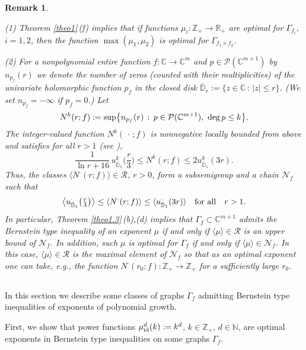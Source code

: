 \documentclass[11pt, oneside]{amsart}
\newtheorem{R}[Th]{Remark}
\begin{document}
\begin{R}\label{rem1.3}
{\rm (1) Theorem \ref{theo1}\,(f) implies that if functions $\mu_i:\mathbb Z_+\rightarrow\mathbb R_+$ are optimal for $\Gamma_{f_i}$, $i=1,2$, then the function
$\max(\mu_1,\mu_2)$ is optimal for $\Gamma_{f_1\times f_2}$.\smallskip

\noindent (2) For a nonpolynomial entire function $f:\mathbb C\rightarrow\mathbb C^m$ and $p\in\mathcal P(\mathbb C^{m+1})$ by $n_{p_f}(r)$ we denote the number of zeros (counted with their multiplicities) of the univariate holomorphic function $p_f$ in the closed disk $\bar{\mathbb D}_r:=\{z\in\mathbb C\, :\, |z|\le r\}$. (We set $n_{p_f}=-\infty$ if $p_f=0$.) Let 
\[
N^k(r;f):=\sup\bigl\{n_{p_f}(r)\, :\, p\in\mathcal P(\mathbb C^{m+1}),\  {\rm deg}\, p\le k\bigr\}.
\]
The integer-valued function $N^k(\,\cdot\, ;f)$ is nonnegative locally bounded from above and satisfies for all $r>1$ (see \cite[Cor.\,2.3]{CP1}),
\[
\frac{1}{\ln r+16}\,u_{\bar{\mathbb D}_1}^k\bigl(\mbox{$\frac r3$}\bigr)\le N^k(r;f)\le  2u_{\bar{\mathbb D}_1}^k(3r).
\]
Thus, the classes $\langle N^{\cdot}(r;f)\rangle\in\mathscr R$, $r>0$, form
a subsemigroup and a chain $\mathscr N_f$ such that
\[
\bigl\langle u_{\bar{\mathbb D}_1}^\cdot\bigl(\mbox{$\frac r3$}\bigr)\bigr\rangle\le \langle N^\cdot (r;f)\rangle\le  \langle u_{\bar{\mathbb D}_1}^\cdot (3r)\rangle\quad {\rm for\ all}\quad r>1.
\]
In particular, Theorem \ref{theo1.3}\,(b),(d) implies that $\Gamma_f\subset\mathbb C^{m+1}$ admits the Bernstein type inequality of an exponent $\mu$ if and only if $\langle\mu\rangle\in\mathscr R$ is an upper bound of $\mathscr N_f$. In addition, such $\mu$ is optimal for $\Gamma_f$ if and only if $\langle\mu\rangle\in\mathscr N_f$. In this case, $\langle\mu\rangle\in\mathscr R$ is the maximal element of $\mathscr N_f$ so that as an optimal exponent one can take, e.g., the function $N^{\cdot}(r_0;f):\mathbb Z_+\rightarrow\mathbb Z_+$ for a sufficiently large $r_0$.
}
\end{R}
\subsection{} In this section we describe some classes of graphs $\Gamma_f$ admitting Bernstein type inequalities of exponents of polynomial growth.  \smallskip

First, we show that power functions $\mu_{{\rm id}}^{d}(k):=k^d$, $k\in\mathbb Z_+$, $d\in\mathbb N$, are optimal exponents in Bernstein type inequalities on some graphs $\Gamma_f$. \smallskip
\end{document}
